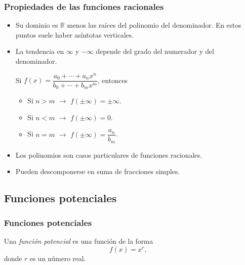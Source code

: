 	
	\begin{frame}
		\frametitle{Propiedades de las funciones racionales}
		\begin{itemize}
			\item Su dominio es $\mathbb{R}$ menos las raíces del polinomio del denominador. En estos puntos suele haber asíntotas
			      verticales.
			\item La tendencia en $\infty$ y $-\infty$ depende del grado del numerador y del denominador. 
			      
			      Si $f(x)=\dfrac{a_0+\cdots +a_nx^n}{b_0+\cdots+b_mx^m}$, entonces
			      \begin{itemize}
			      	\item Si $n>m$ $\rightarrow$ $f(\pm\infty)=\pm\infty$.
			      	\item Si $n<m$ $\rightarrow$ $f(\pm\infty)=0$.
			      	\item Si $n=m$ $\rightarrow$ $f(\pm\infty)=\dfrac{a_n}{b_m}$.
			      \end{itemize}
			\item Los polinomios son casos particulares de funciones racionales. 
			\item Pueden descomponerse en suma de fracciones simples.
		\end{itemize}
	\end{frame} 
	
	
	
	\subsection{Funciones potenciales}
	\begin{frame}
		\frametitle{Funciones potenciales}
		\begin{definicion}
			Una \emph{función potencial} es una función de la forma
			\[
				f(x)=x^r,
			\]
			donde $r$ es un número real.
		\end{definicion}
		\begin{center}
			\scalebox{1}{}
		\end{center}
	\end{frame} 
	
